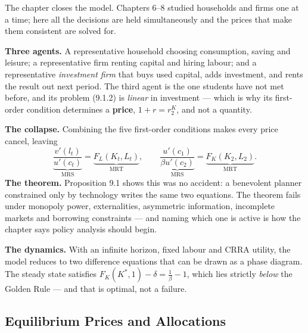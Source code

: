 \documentclass[12pt, letterpaper]{article}
\newcommand{\MRS}{\mathrm{MRS}}
\newcommand{\MRT}{\mathrm{MRT}}
\newcommand{\stst}{^{\ast}}
\begin{document}
\begin{tcolorbox}[theorybox,title={Chapter 9 Overview}]
The chapter closes the model. Chapters 6--8 studied households and firms one at a time;
here all the decisions are held simultaneously and the prices that make them consistent
are solved for.

\smallskip
\textbf{Three agents.} A representative household choosing consumption, saving and
leisure; a representative firm renting capital and hiring labour; and a representative
\emph{investment firm} that buys used capital, adds investment, and rents the result out
next period. The third agent is the one students have not met before, and its problem
(9.1.2) is \emph{linear} in investment --- which is why its first-order condition
determines a \textbf{price}, $1+r=r^K_2$, and not a quantity.

\smallskip
\textbf{The collapse.} Combining the five first-order conditions makes every price cancel,
leaving
\[
\underbrace{\frac{v'(l_t)}{u'(c_t)}}_{\MRS}=\underbrace{F_L(K_t,L_t)}_{\MRT},
\qquad
\underbrace{\frac{u'(c_1)}{\beta u'(c_2)}}_{\MRS}=\underbrace{F_K(K_2,L_2)}_{\MRT}.
\]
\textbf{The theorem.} Proposition 9.1 shows this was no accident: a benevolent planner
constrained only by technology writes the same two equations. The theorem fails under
monopoly power, externalities, asymmetric information, incomplete markets and borrowing
constraints --- and naming which one is active is how the chapter says policy analysis
should begin.

\smallskip
\textbf{The dynamics.} With an infinite horizon, fixed labour and CRRA utility, the model
reduces to two difference equations that can be drawn as a phase diagram. The steady state
satisfies $F_K(K\stst,1)-\delta=\frac{1}{\beta}-1$, which lies strictly \emph{below} the
Golden Rule --- and that is optimal, not a failure.
\end{tcolorbox}

\subsection{Equilibrium Prices and Allocations}
\end{document}
